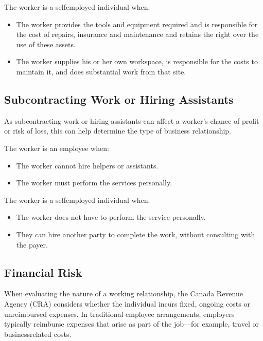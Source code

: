 \documentclass[letterpaper,10pt,english]{sphinxmanual}
\begin{document}
\sphinxAtStartPar
The worker is a self\sphinxhyphen{}employed individual when:
\begin{itemize}
\item {} 
\sphinxAtStartPar
The worker provides the tools and equipment required and is responsible for the cost of repairs, insurance and maintenance and retains the right over the use of these assets.

\item {} 
\sphinxAtStartPar
The worker supplies his or her own workspace, is responsible for the costs to maintain it, and does substantial work from that site.

\end{itemize}


\subsection{Subcontracting Work or Hiring Assistants}
\label{\detokenize{compliance:subcontracting-work-or-hiring-assistants}}
\sphinxAtStartPar
As subcontracting work or hiring assistants can affect a worker’s chance of profit or risk of loss, this can help determine
the type of business relationship.

\sphinxAtStartPar
The worker is an employee when:
\begin{itemize}
\item {} 
\sphinxAtStartPar
The worker cannot hire helpers or assistants.

\item {} 
\sphinxAtStartPar
The worker must perform the services personally.

\end{itemize}

\sphinxAtStartPar
The worker is a self\sphinxhyphen{}employed individual when:
\begin{itemize}
\item {} 
\sphinxAtStartPar
The worker does not have to perform the service personally.

\item {} 
\sphinxAtStartPar
They can hire another party to complete the work, without consulting with the payer.

\end{itemize}


\subsection{Financial Risk}
\label{\detokenize{compliance:financial-risk}}
\sphinxAtStartPar
When evaluating the nature of a working relationship, the Canada Revenue Agency (CRA) considers whether the individual
incurs fixed, ongoing costs or unreimbursed expenses. In traditional employee arrangements, employers typically reimburse
expenses that arise as part of the job—for example, travel or business\sphinxhyphen{}related costs.
\end{document}
